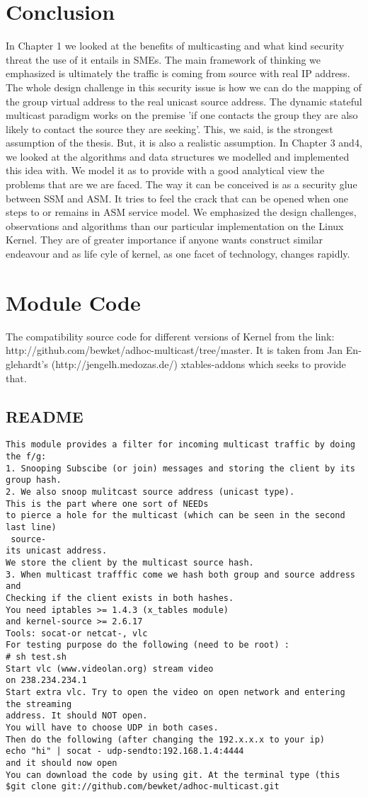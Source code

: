 \chapter{Conclusion}
In Chapter 1 we looked at the benefits of multicasting and what kind security
threat the use of it entails in SMEs. The main framework of thinking we emphasized
is ultimately the traffic is coming from source with real IP address. The whole
design challenge in this security issue is how we can do the mapping of the group
virtual address to the real unicast source address. The dynamic stateful multicast
paradigm works on the premise ’if one contacts the group they are also likely to
contact the source they are seeking’. This, we said, is the strongest assumption of
the thesis. But, it is also a realistic assumption.
In Chapter 3 and4, we looked at the algorithms and data structures we modelled
and implemented this idea with. We model it as to provide with a good analytical
view the problems that are we are faced. The way it can be conceived is as a
security glue between SSM and ASM. It tries to feel the crack that can be opened
when one steps to or remains in ASM service model.
We emphasized the design challenges, observations and algorithms than our
particular implementation on the Linux Kernel. They are of greater importance if
anyone wants construct similar endeavour and as life cyle of kernel, as one facet of
technology, changes rapidly.
\appendix
\chapter{Module Code}
The compatibility source code for different versions of Kernel from the link:
http://github.com/bewket/adhoc-multicast/tree/master. It is taken from Jan En-
glehardt’s (http://jengelh.medozas.de/) xtables-addons which seeks to provide that.
\section{README}
\begin{verbatim}
This module provides a filter for incoming multicast traffic by doing the f/g:
1. Snooping Subscibe (or join) messages and storing the client by its group hash.
2. We also snoop mulitcast source address (unicast type). 
This is the part where one sort of NEEDs
to pierce a hole for the multicast (which can be seen in the second last line)
 source-
its unicast address.
We store the client by the multicast source hash.
3. When multicast trafffic come we hash both group and source address and
Checking if the client exists in both hashes.
You need iptables >= 1.4.3 (x_tables module)
and kernel-source >= 2.6.17
Tools: socat-or netcat-, vlc
For testing purpose do the following (need to be root) :
# sh test.sh
Start vlc (www.videolan.org) stream video
on 238.234.234.1
Start extra vlc. Try to open the video on open network and entering the streaming
address. It should NOT open.
You will have to choose UDP in both cases.
Then do the following (after changing the 192.x.x.x to your ip)
echo "hi" | socat - udp-sendto:192.168.1.4:4444
and it should now open
You can download the code by using git. At the terminal type (this
$git clone git://github.com/bewket/adhoc-multicast.git
\end{verbatim}
